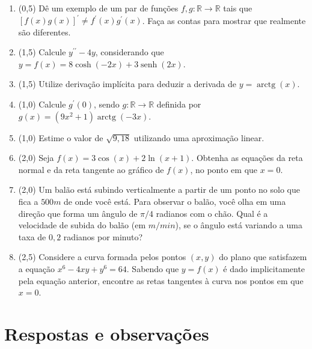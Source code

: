 \documentclass[12pt,a4paper]{article}
\newcommand*\senh{\operatorname{senh}}
\newcommand*\arctg{\operatorname{arctg}}
\begin{document}
\begin{enumerate}
\item (0,5) Dê um exemplo de um par de funções $f, g: \mathbb{R} \to \mathbb{R}$ tais que $\left[f(x)g(x)\right]^\prime \neq f^\prime(x)g^\prime(x)$. Faça as contas para mostrar que realmente são diferentes.

\item (1,5) Calcule $y^{\prime\prime} - 4y$, considerando que $y=f(x) = 8\cosh(-2x) + 3\senh(2x)$.

\item (1,5) Utilize derivação implícita para deduzir a derivada de $y = \arctg(x)$.

\item (1,0) Calcule $g^\prime(0)$, sendo $g:\mathbb{R} \to \mathbb{R}$ definida por $g(x) = (9x^2 + 1)\arctg(-3x)$.

\item (1,0) Estime o valor de $\sqrt{9,18}$ utilizando uma aproximação linear.

\item (2,0) Seja $f(x) = 3 \cos(x) + 2 \ln(x + 1)$. Obtenha as equações da reta normal e da reta tangente ao gráfico de $f(x)$, no ponto em que $x = 0$.

\item (2,0) Um balão está subindo verticalmente a partir de um ponto no solo que fica a $500m$ de onde você está. Para observar o balão, você olha em uma direção que forma um ângulo de $\pi/4$ radianos com o chão. Qual é a velocidade de subida do balão (em $m/min$), se o ângulo está variando a uma taxa de $0,2$ radianos por minuto?

\item (2,5) Considere a curva formada pelos pontos $(x,y)$ do plano que satisfazem a equação $x^6 - 4x y + y^6 = 64$. Sabendo que $y = f(x)$ é dado implicitamente pela equação anterior, encontre as retas tangentes à curva nos pontos em que $x=0$.
\end{enumerate}

\newpage
\restoregeometry
\section*{Respostas e observações}
\end{document}
